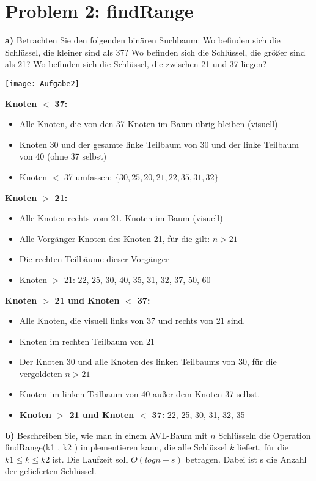 \section*{Problem 2: findRange} 


\textbf{a)} Betrachten Sie den folgenden binären Suchbaum:
\noindent
Wo befinden sich die Schlüssel, die kleiner sind als 37? Wo befinden sich die
Schlüssel, die größer sind als 21? Wo befinden sich die Schlüssel, die zwischen
21 und 37 liegen?

\begin{center}
\texttt{[image: Aufgabe2]}
\end{center}


\textbf{Knoten $<$ 37:}
\begin{itemize}
\item Alle Knoten, die von den 37 Knoten im Baum übrig bleiben (visuell)
\item Knoten 30 und der gesamte linke Teilbaum von 30 und der linke Teilbaum von 40 (ohne 37 selbst)
\item Knoten $<$ 37 umfassen: $\{30, 25, 20, 21, 22, 35, 31, 32\}$
\end{itemize}


\textbf{Knoten $>$ 21:}
\begin{itemize}
\item Alle Knoten rechts vom 21. Knoten im Baum (visuell)
\item Alle Vorgänger Knoten des Knoten 21, für die gilt: $n > 21$
\item Die rechten Teilbäume dieser Vorgänger
\item Knoten $>$ 21: {22, 25, 30, 40, 35, 31, 32, 37, 50, 60}
\end{itemize}


\textbf{Knoten $>$ 21 und Knoten $<$ 37:}
\begin{itemize}
\item Alle Knoten, die visuell links von 37 und rechts von 21 sind.
\item Knoten im rechten Teilbaum von 21
\item Der Knoten 30 und alle Knoten des linken Teilbaums von 30, für die vergoldeten $n > 21$
\item Knoten im linken Teilbaum von 40 außer dem Knoten 37 selbst.
\item \textbf{Knoten $>$ 21 und Knoten $<$ 37:} {22, 25, 30, 31, 32, 35}
\end{itemize}


\newpage
\noindent
\textbf{b)} Beschreiben Sie, wie man in einem AVL-Baum mit $n$ Schlüsseln die Operation
findRange(k1 , k2 ) implementieren kann, die alle Schlüssel $k$ liefert, für die
$k1 \leq k \leq k2$ ist. Die Laufzeit soll $O(log n + s)$ betragen. Dabei ist s die Anzahl
der gelieferten Schlüssel.\\

